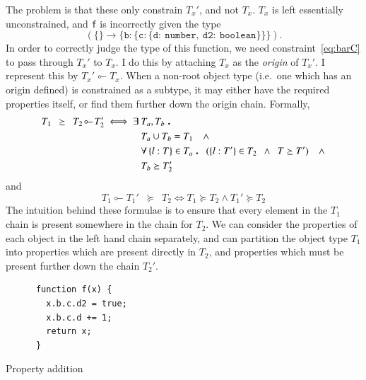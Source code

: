 \documentclass[12pt,a4paper,twoside,openright]{report}
\theoremstyle{definition}
\theoremstyle{dotless}
\newcommand*{\js}{\texttt}
\newcommand*{\orig}{\ensuremath{\!\multimapinv\!}}
\newcommand\qdot{\mathbin{\scalebox{1.5}{.}}\enspace}
\begin{document}
The problem is that these only constrain $T_x'$, and not $T_x$. $T_x$ is
left essentially unconstrained, and \js{f} is incorrectly given the type
$$\mathtt{(\mathtt{\{\} \rightarrow \{b:\{c:\{d:\ number,\ d2:\ boolean\}\}\}})}.$$ In order to
correctly judge the type of this function, we need constraint~\eqref{eq:barC}
to pass through $T_x'$ to $T_x$. I do this by attaching $T_x$ as the
\textit{origin} of $T_x'$. I represent this by $T_x'\orig T_x$. When a
non-root object type (i.e.~one which has an origin defined) is constrained as a
subtype, it may either have the required properties itself, or find them
further down the origin chain. Formally,
\begin{equation}
  \begin{split}
	T_1\enspace \succeq\enspace T_2\orig T_2' \iff \exists\ & T_a, T_b\ \qdot\\
	& T_a\cup T_b = T_1 \quad\land \\
	& \forall \left\{l: T\right\} \in T_a \qdot (\{l: T'\}\in T_2\enspace \land \enspace T \succeq T') \quad\land \\
	& T_b \succeq T_2'
  \end{split}
  \label{succeq}
\end{equation}
and
\begin{equation}
  T_1\orig T_1'\enspace \succeq \enspace T_2 \iff T_1\succeq T_2 \land T_1' \succeq T_2
\end{equation}
The intuition behind these formulae is to ensure that every element in the
$T_1$ chain is present somewhere in the chain for $T_2$.  We can consider the
properties of each object in the left hand chain separately, and can partition
the object type $T_1$ into properties which are present directly in $T_2$, and
properties which must be present further down the chain $T_2'$.


\begin{program}[t]
  \centering
  \begin{minipage}[b]{0.45\linewidth}
 	\begin{verbatim}
	  function f(x) {
	 	x.b.c.d2 = true;
	 	x.b.c.d += 1;
	 	return x;
	  }	
 	\end{verbatim}
 	\vspace{23mm}
  \end{minipage}
  \quad
  \begin{minipage}[b]{0.45\linewidth}
  \end{minipage}
  \caption{Property addition}\label{lst:propAdd}
\end{program}
\end{document}
